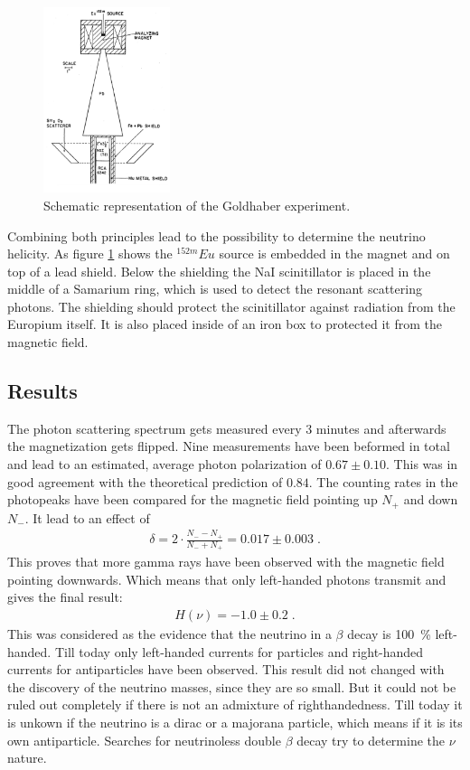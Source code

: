 \begin{figure}
    \includegraphics[width=0.33\textwidth]{graphics/gold.png}
    \caption{Schematic representation of the Goldhaber experiment.\cite{gold}}
		\label{fig:gold}
  \end{figure}
  \FloatBarrier

Combining both principles lead to the possibility to determine the neutrino helicity. As figure \ref{fig:gold} shows the $^{152m}Eu$ source is embedded in the magnet and on top of a lead shield. Below the shielding the NaI scinitillator is placed in the middle of a Samarium ring, which is used to detect the resonant scattering photons. The shielding should protect the scinitillator against radiation from the Europium itself. It is also placed inside of an iron box to protected it from the magnetic field.
\subsection{Results}
The photon scattering spectrum gets measured every $3$ minutes and afterwards the magnetization gets flipped. Nine measurements have been beformed in total and lead to an estimated, average photon polarization of $0.67 \pm 0.10$. This was in good agreement with the theoretical prediction of $0.84$. The counting rates in the photopeaks have been compared for the magnetic field pointing up $N_+$ and down $N_-$. It lead to an effect of
\begin{align*}
	\delta = 2 \cdot \frac{N_- - N_+}{N_- + N_+} = 0.017 \pm 0.003\;.
\end{align*}
This proves that more gamma rays have been observed with the magnetic field pointing downwards. Which means that only left-handed photons transmit and gives the final result:
\begin{align*}
	H(\nu) = -1.0 \pm 0.2 \; .
\end{align*}
This was considered as the evidence that the neutrino in a $\beta$ decay is \SI{100}{\percent} left-handed. Till today only left-handed currents for particles and right-handed currents for antiparticles have been observed. This result did not changed with the discovery of the neutrino masses, since they are so small. But it could not be ruled out completely if there is not an admixture of righthandedness. Till today it is unkown if the neutrino is a dirac or a majorana particle, which means if it is its own antiparticle. Searches for neutrinoless double $\beta$ decay try to determine the $\nu$ nature.
